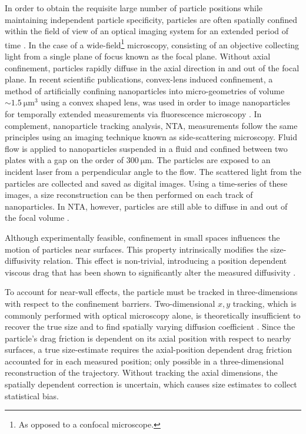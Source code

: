 In order to obtain the requisite large number of particle positions while maintaining independent particle specificity, particles are often spatially confined within the field of view of an optical imaging system for an extended period of time \cite{Hou2019MoleculesReview}. In the case of a wide-field\footnote{As opposed to a confocal microscope.} microscopy, consisting of an objective collecting light from a single plane of focus known as the focal plane. Without axial confinement, particles rapidly diffuse in the axial direction in and out of the focal plane. In recent scientific publications, convex-lens induced confinement, a method of artificially confining nanoparticles into micro-geometries of volume $\sim \SI{1.5}{\micro \meter^3}$ using a convex shaped lens, was used in order to image nanoparticles for temporally extended measurements via fluorescence microscopy \cite{kamanziSimultaneousSingleParticleMeasurements2021,kamanzi_single-particle_2026,graves_direct_2026}. In complement, nanoparticle tracking analysis, NTA, measurements follow the same principles using an imaging technique known as side-scattering microscopy. Fluid flow is applied to nanoparticles suspended in a fluid and confined between two plates with a gap on the order of $\SI{300}{\micro \meter}$. The particles are exposed to an incident laser from a perpendicular angle to the flow. The scattered light from the particles are collected and saved as digital images. Using a time-series of these images, a size reconstruction can be then performed on each track of nanoparticles. In NTA, however, particles are still able to diffuse in and out of the focal volume \cite{filipeCriticalEvaluationNanoparticle2010}.

Although experimentally feasible, confinement in small spaces influences the motion of particles near surfaces. This property intrinsically modifies the size-diffusivity relation. This effect is non-trivial, introducing a position dependent viscous drag that has been shown to significantly alter the measured diffusivity \cite{swanParticleMotionParallel2010,bian111YearsBrownian2016}. 

To account for near-wall effects, the particle must be tracked in three-dimensions with respect to the confinement barriers. Two-dimensional $x,y$ tracking, which is commonly performed with optical microscopy alone, is theoretically insufficient to recover the true size and to find spatially varying diffusion coefficient \cite{Welsher2025Hydrogels}. Since the particle's drag friction is dependent on its axial position with respect to nearby surfaces, a true size-estimate requires the axial-position dependent drag friction accounted for in each measured position; only possible in a three-dimensional reconstruction of the trajectory. Without tracking the axial dimensions, the spatially dependent correction is uncertain, which causes size estimates to collect statistical bias. 


